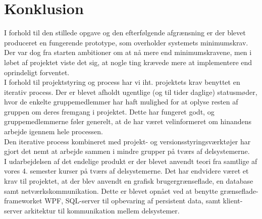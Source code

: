 \chapter{Konklusion}
I forhold til den stillede opgave og den efterfølgende afgrænsning er der blevet produceret en fungerende prototype, som overholder systemets minimumskrav. Der var dog fra starten ambitioner om at nå mere end minimumskravene, men i løbet af projektet viste det sig, at nogle ting krævede mere at implementere end oprindeligt forventet.\\

I forhold til projektstyring og process har vi iht. projektets krav benyttet en iterativ process. Der er blevet afholdt ugentlige (og til tider daglige) statusmøder, hvor de enkelte gruppemedlemmer har haft mulighed for at oplyse resten af gruppen om deres fremgang i projektet. Dette har fungeret godt, og gruppemedlemmerne føler generelt, at de har været velinformeret om hinandens arbejde igennem hele processen.\\

Den iterative process kombineret med projekt- og versionsstyringsværktøjer har gjort det nemt at arbejde sammen i mindre grupper på tværs af delsystemerne.\\

I udarbejdelsen af det endelige produkt er der blevet anvendt teori fra samtlige af vores 4. semester kurser på tværs af delsystemerne. Det har endvidere været et krav til projektet, at der blev anvendt en grafisk brugergrænseflade, en database samt netværkskommunikation. Dette er blevet opnået ved at benytte grænseflade-frameworket WPF, SQL-server til opbevaring af persistent data, samt klient-server arkitektur til kommunikation mellem delsystemer.\\